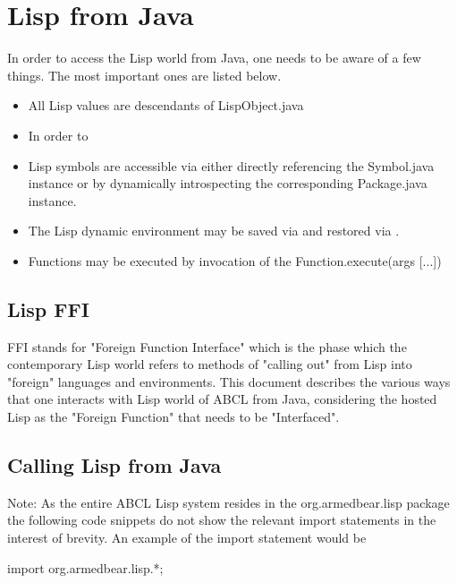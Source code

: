 \documentclass[10pt]{book}
\begin{document}

\section{Lisp from Java}

In order to access the Lisp world from Java, one needs to be aware
of a few things. The most important ones are listed below.

\begin{itemize}
\item All Lisp values are descendants of LispObject.java
\item In order to 
\item Lisp symbols are accessible via either directly referencing the
  Symbol.java instance or by dynamically introspecting the
  corresponding Package.java instance.
\item The Lisp dynamic environment may be saved via
   and restored via
  .
\item Functions may be executed by invocation of the
  Function.execute(args [...]) 
\end{itemize}

\subsection{Lisp FFI}

FFI stands for "Foreign Function Interface" which is the phase which
the contemporary Lisp world refers to methods of "calling out" from
Lisp into "foreign" languages and environments.  This document
describes the various ways that one interacts with Lisp world of ABCL
from Java, considering the hosted Lisp as the "Foreign Function" that
needs to be "Interfaced".

\subsection{Calling Lisp from Java}

Note: As the entire ABCL Lisp system resides in the org.armedbear.lisp
package the following code snippets do not show the relevant import
statements in the interest of brevity.  An example of the import
statement would be

\begin{listing-java}
  import org.armedbear.lisp.*;
\end{listing-java}
\end{document}
